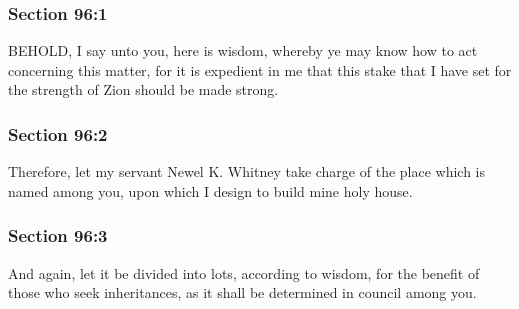 	\subsubsection{Section 96:1} %
		\label{DC96-1}

		BEHOLD, I say unto you, here is wisdom, whereby ye may know how to act concerning this matter, for it is expedient in me that this stake that I have set for the strength of Zion should be made strong.


	\subsubsection{Section 96:2} %
		\label{DC96-2}

		Therefore, let my servant Newel K. Whitney take charge of the place which is named among you, upon which I design to build mine holy house.


	\subsubsection{Section 96:3} %
		\label{DC96-3}

		And again, let it be divided into lots, according to wisdom, for the benefit of those who seek inheritances, as it shall be determined in council among you.


